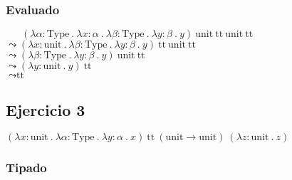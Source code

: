\documentclass[a4paper]{article}
\newcommand{\Type}{\text{Type}}
\newcommand{\TT}{\text{tt}}
\newcommand{\Unit}{\text{unit}}
\begin{document}
\begin{landscape}
\subsubsection{Evaluado}

\noindent
$\phantom{\leadsto\ }
 (\lambda \alpha : \Type\ .\
  \lambda x : \alpha\ .\
  \lambda \beta : \Type\ .\
  \lambda y : \beta\ .\
  y)\
 \Unit\ \TT\ \Unit\ \TT$ \\
$\leadsto
 (\lambda x : \Unit\ .\
  \lambda \beta : \Type\ .\
  \lambda y : \beta\ .\
  y)\
 \TT\ \Unit\ \TT$ \\
$\leadsto
 (\lambda \beta : \Type\ .\
  \lambda y : \beta\ .\
  y)\
 \Unit\ \TT$ \\
$\leadsto
 (\lambda y : \Unit\ .\
  y)\
 \TT$ \\
$\leadsto
 \TT$ \\




\newpage

\subsection{Ejercicio 3}


$(\lambda x : \Unit\ .\
  \lambda \alpha : \Type\ .\
  \lambda y : \alpha\ .\
  x)\
 \TT\ (\Unit \rightarrow \Unit)\
 (\lambda z : \Unit\ .\
  z)$ \\


\subsubsection{Tipado}


\end{landscape}
\end{document}
